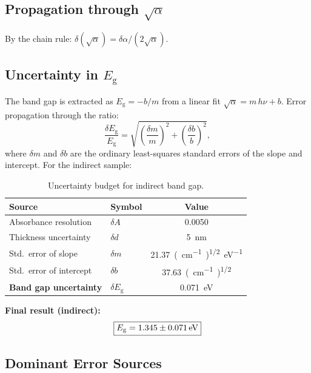\documentclass[12pt,a4paper]{article}
\newcommand{\Eg}{E_{\mathrm{g}}}
\newcommand{\hnu}{h\nu}
\begin{document}
\subsection{Propagation through $\sqrt{\alpha}$}

By the chain rule: $\delta(\sqrt{\alpha}) = \delta\alpha / (2\sqrt{\alpha})$.

\subsection{Uncertainty in $\Eg$}

The band gap is extracted as $\Eg = -b/m$ from a linear fit $\sqrt{\alpha} = m\,\hnu + b$.
Error propagation through the ratio:
\begin{equation}
  \frac{\delta\Eg}{\Eg} = \sqrt{
    \left(\frac{\delta m}{m}\right)^2 + \left(\frac{\delta b}{b}\right)^2
  },
\end{equation}
where $\delta m$ and $\delta b$ are the ordinary least-squares standard errors of the
slope and intercept.  For the indirect sample:

\begin{table}[h]
  \centering
  \caption{Uncertainty budget for indirect band gap.}
  \label{tab:errors}
  \begin{tabular}{llS[table-format=2.4]}
    \toprule
    Source & Symbol & {Value} \\
    \midrule
    Absorbance resolution & $\delta A$ & 0.0050 \\
    Thickness uncertainty & $\delta d$ & \SI{5}{nm} \\
    Std.\ error of slope  & $\delta m$ & \SI{21.37}{(cm^{-1})^{1/2} eV^{-1}} \\
    Std.\ error of intercept & $\delta b$ & \SI{37.63}{(cm^{-1})^{1/2}} \\
    \midrule
    \textbf{Band gap uncertainty} & $\delta\Eg$ & \SI{0.071}{eV} \\
    \bottomrule
  \end{tabular}
\end{table}

\noindent
\textbf{Final result (indirect):}
\begin{equation}
  \boxed{\Eg = \SI[parse-numbers=false]{1.345 \pm 0.071}{eV}}
\end{equation}

\subsection{Dominant Error Sources}
\end{document}
